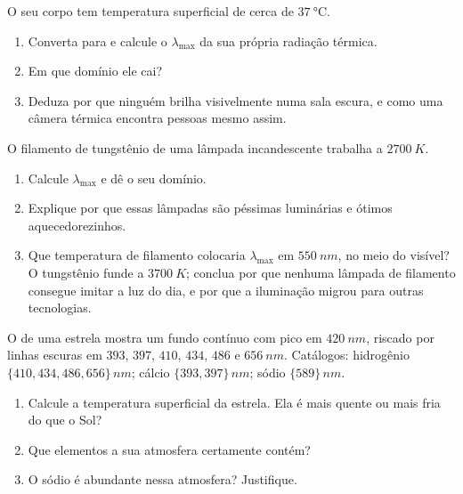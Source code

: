 \begin{exercise}[$\star\star$]\label{exo:g10:light-spectra:11}
O seu corpo tem temperatura superficial de cerca de
$\qty{37}{\degreeCelsius}$.
\begin{enumerate}
  \item Converta para  e calcule o $\lambda_{\max}$ da sua própria
        radiação térmica.
  \item Em que domínio ele cai?
  \item Deduza por que ninguém brilha visivelmente numa sala escura, e como
        uma câmera térmica encontra pessoas mesmo assim.
\end{enumerate}
\end{exercise}

\begin{exercise}[$\star\star\star$]\label{exo:g10:light-spectra:12}
O filamento de tungstênio de uma lâmpada incandescente trabalha a
$\qty{2700}{K}$.
\begin{enumerate}
  \item Calcule $\lambda_{\max}$ e dê o seu domínio.
  \item Explique por que essas lâmpadas são péssimas luminárias e ótimos
        aquecedorezinhos.
  \item Que temperatura de filamento colocaria $\lambda_{\max}$ em
        $\qty{550}{nm}$, no meio do visível? O tungstênio funde a
        $\qty{3700}{K}$; conclua por que nenhuma lâmpada de filamento
        consegue imitar a luz do dia, e por que a iluminação migrou para
        outras tecnologias.
\end{enumerate}
\end{exercise}

\begin{exercise}[$\star\star\star$]\label{exo:g10:light-spectra:13}
O  de uma estrela mostra um fundo contínuo com pico em
$\qty{420}{nm}$, riscado por linhas escuras em $393$, $397$, $410$, $434$,
$486$ e $\qty{656}{nm}$. Catálogos: hidrogênio
$\{410, 434, 486, 656\}\,\unit{nm}$; cálcio $\{393, 397\}\,\unit{nm}$; sódio
$\{589\}\,\unit{nm}$.
\begin{enumerate}
  \item Calcule a temperatura superficial da estrela. Ela é mais quente ou
        mais fria do que o Sol?
  \item Que elementos a sua atmosfera certamente contém?
  \item O sódio é abundante nessa atmosfera? Justifique.
\end{enumerate}
\end{exercise}


